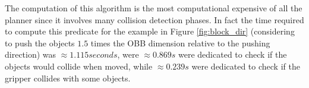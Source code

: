 The computation of this algorithm is the most computational expensive of all the planner since it involves many collision detection phases. In fact the time required to compute this predicate for the example in Figure \ref{fig:block_dir} (considering to push the objects $1.5$ times the OBB dimension relative to the pushing direction) was $\approx 1.115 seconds$, were $\approx 0.869s$ were dedicated to check if the objects would collide when moved, while $\approx 0.239s$ were dedicated to check if the gripper collides with some objects.  

